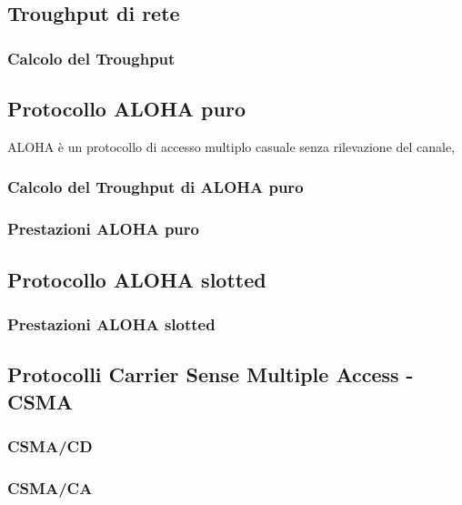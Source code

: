\subsection{Troughput di rete}
\subsubsection{Calcolo del Troughput}

\subsection{Protocollo ALOHA puro}
ALOHA è un protocollo di accesso multiplo casuale senza rilevazione del canale, 

\subsubsection{Calcolo del Troughput di ALOHA puro}

\subsubsection{Prestazioni ALOHA puro}

\subsection{Protocollo ALOHA slotted}
\subsubsection{Prestazioni ALOHA slotted}

\subsection{Protocolli Carrier Sense Multiple Access - CSMA}
\subsubsection{CSMA/CD}


\subsubsection{CSMA/CA}
